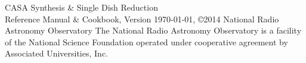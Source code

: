 
\begin{center}
{\sc CASA Synthesis \& Single Dish Reduction\\ Reference Manual \& Cookbook}, 
\break
Version \today,
\break
\copyright 2014 National Radio Astronomy Observatory
\break
\break
The National Radio Astronomy Observatory is a facility of the National
Science Foundation operated under cooperative agreement by Associated
Universities, Inc.\\[1cm]
\end{center}

%
%



\pagebreak
~
\pagebreak